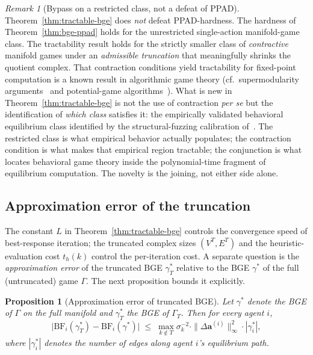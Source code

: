 \documentclass[11pt]{article}
\newtheorem{proposition}[theorem]{Proposition}
\theoremstyle{definition}
\theoremstyle{remark}
\newtheorem{remark}[theorem]{Remark}
\newcommand{\BF}{\mathrm{BF}}
\begin{document}
\begin{remark}[Bypass on a restricted class, not a defeat of \textsc{PPAD}]
\label{rem:bypass}
Theorem~\ref{thm:tractable-bge} does \emph{not} defeat \textsc{PPAD}-hardness. The hardness of
Theorem~\ref{thm:bge-ppad} holds for the unrestricted single-action manifold-game class. The
tractability result holds for the strictly smaller class of \emph{contractive} manifold games under
an \emph{admissible truncation} that meaningfully shrinks the quotient complex. That contraction
conditions yield tractability for fixed-point computation is a known result in algorithmic game theory
(cf.\ supermodularity arguments~\cite{milgrom1990} and potential-game algorithms~\cite{monderer1996}).
What is new in Theorem~\ref{thm:tractable-bge} is not the use of contraction \emph{per se} but
the identification of \emph{which class} satisfies it: the empirically validated behavioral
equilibrium class identified by the structural-fuzzing calibration of~\cite{bond2026tcss}. The
restricted class is what empirical behavior actually populates; the contraction condition is what
makes that empirical region tractable; the conjunction is what locates behavioral game theory inside
the polynomial-time fragment of equilibrium computation. The novelty is the joining, not either side
alone.
\end{remark}

\subsection{Approximation error of the truncation}

The constant $L$ in Theorem~\ref{thm:tractable-bge} controls the convergence speed of best-response
iteration; the truncated complex sizes $(V^T, E^T)$ and the heuristic-evaluation cost $t_h(k)$
control the per-iteration cost. A separate question is the \emph{approximation error} of the
truncated BGE $\gamma_T^*$ relative to the BGE $\gamma^*$ of the full (untruncated) game $\Gamma$.
The next proposition bounds it explicitly.

\begin{proposition}[Approximation error of truncated BGE]
\label{prop:approx}
Let $\gamma^*$ denote the BGE of $\Gamma$ on the full manifold and $\gamma_T^*$ the BGE of
$\Gamma_T$. Then for every agent $i$,
\[
\bigl| \BF_i(\gamma_T^*) - \BF_i(\gamma^*) \bigr|
\;\leq\; \max_{k \notin T} \sigma_k^{-2} \cdot \|\Delta\mathbf{a}^{(i)}\|_\infty^2 \cdot |\gamma_i^*|,
\]
where $|\gamma_i^*|$ denotes the number of edges along agent $i$'s equilibrium path.
\end{proposition}
\end{document}
